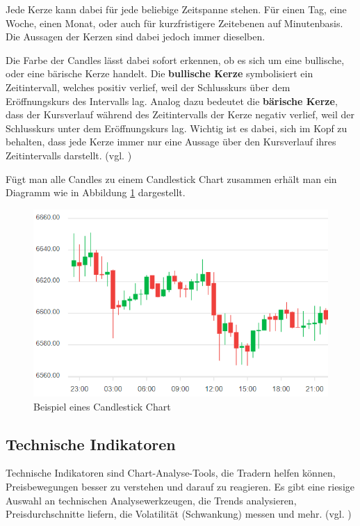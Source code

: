 \documentclass[oneside]{ausarbeitung}
\begin{document}
Jede Kerze kann dabei für jede beliebige Zeitspanne stehen. Für einen Tag, eine Woche, einen Monat, oder auch für kurzfristigere Zeitebenen auf Minutenbasis. Die Aussagen der Kerzen sind dabei jedoch immer dieselben.

Die Farbe der Candles lässt dabei sofort erkennen, ob es sich um eine bullische, oder eine bärische Kerze handelt. Die \textbf{bullische Kerze} symbolisiert ein Zeitintervall, welches positiv verlief, weil der Schlusskurs über dem Eröffnungskurs des Intervalls lag. Analog dazu bedeutet die \textbf{bärische Kerze}, dass der Kursverlauf während des Zeitintervalls der Kerze negativ verlief, weil der Schlusskurs unter dem Eröffnungskurs lag. Wichtig ist es dabei, sich im Kopf zu behalten, dass jede Kerze immer nur eine Aussage über den Kursverlauf ihres Zeitintervalls darstellt. (vgl. \cite{candles_explained})
 
Fügt man alle Candles zu einem Candlestick Chart zusammen erhält man ein Diagramm wie in Abbildung \ref{fig:2} dargestellt. \\

\begin{figure}[H]
  \centering
  \includegraphics[height=0.43\textheight]{img/candlestick_chart.png}
  \caption{Beispiel eines Candlestick Chart\cite{candlestick_chart_pic}}
  \label{fig:2}
\end{figure}

\subsection{Technische Indikatoren}
\label{sub:technische_Indikatoren}

Technische Indikatoren sind Chart-Analyse-Tools, die Tradern helfen können, Preisbewegungen besser zu verstehen und darauf zu reagieren. Es gibt eine riesige Auswahl an technischen Analysewerkzeugen, die Trends analysieren, Preisdurchschnitte liefern, die Volatilität (Schwankung) messen und mehr. (vgl. \cite{technical_indicators})
\end{document}
